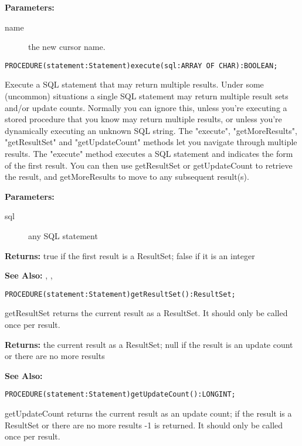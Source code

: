      {\bf Parameters: } 
\begin{description}
\item[name] the new cursor name. 
\end{description}


\verb'PROCEDURE(statement:Statement)execute(sql:ARRAY OF CHAR):BOOLEAN;'

     Execute a SQL statement that may return multiple results. Under some (uncommon) situations a single SQL statement may return
     multiple result sets and/or update counts. Normally you can ignore this, unless you're executing a stored procedure that you know
     may return multiple results, or unless you're dynamically executing an unknown SQL string. The "execute", "getMoreResults",
     "getResultSet" and "getUpdateCount" methods let you navigate through multiple results. The "execute" method executes a SQL
     statement and indicates the form of the first result. You can then use getResultSet or getUpdateCount to retrieve the result, and
     getMoreResults to move to any subsequent result(s). 

     {\bf Parameters: } 
\begin{description}
\item[sql] any SQL statement 
\end{description}

     {\bf Returns: } 
          true if the first result is a ResultSet; false if it is an integer 

     {\bf See Also:} 
          , ,  


\verb'PROCEDURE(statement:Statement)getResultSet():ResultSet;'

     getResultSet returns the current result as a ResultSet. It should only be called once per result. 

     {\bf Returns: } 
          the current result as a ResultSet; null if the result is an update count or there are no more results 

     {\bf See Also:} 


\verb'PROCEDURE(statement:Statement)getUpdateCount():LONGINT;'

     getUpdateCount returns the current result as an update count; if the result is a ResultSet or there are no more results -1 is returned.
     It should only be called once per result. 

